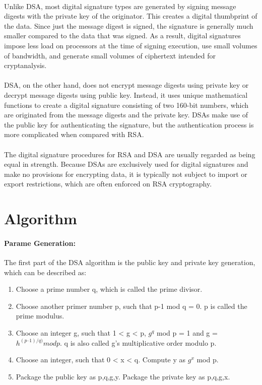 \documentclass[a4paper,12pt]{article}
\newenvironment{codeblock}{\fontfamily{pcr}\selectfont}{\par}
\begin{document}
    \paragraph{} Unlike DSA, most digital signature types are generated by signing message digests with the private key of the originator. This creates a digital thumbprint of the data. Since just the message digest is signed, the signature is generally much smaller compared to the data that was signed. As a result, digital signatures impose less load on processors at the time of signing execution, use small volumes of bandwidth, and generate small volumes of ciphertext intended for cryptanalysis.
    \paragraph{} DSA, on the other hand, does not encrypt message digests using private key or decrypt message digests using public key. Instead, it uses unique mathematical functions to create a digital signature consisting of two 160-bit numbers, which are originated from the message digests and the private key. DSAs make use of the public key for authenticating the signature, but the authentication process is more complicated when compared with RSA.
    \paragraph{} The digital signature procedures for RSA and DSA are usually regarded as being equal in strength. Because DSAs are exclusively used for digital signatures and make no provisions for encrypting data, it is typically not subject to import or export restrictions, which are often enforced on RSA cryptography.
			
\section{Algorithm}
	\paragraph{Parame Generation:} The first part of the DSA algorithm is the public key and private key generation, which can be described as: 
    \begin{codeblock}
    \begin{enumerate}
        \item Choose a prime number q, which is called the prime divisor.
        \item Choose another primer number p, such that p-1 mod q = 0. p is called the prime modulus.
        \item Choose an integer g, such that 1 < g < p, $g^{q}$ mod p = 1 and g = $h^{(p–1)/q)} mod p$. q is also called g's multiplicative order modulo p.
        \item Choose an integer, such that 0 < x < q.
    Compute y as $g^{x}$ mod p.
    	\item Package the public key as {p,q,g,y}.
    Package the private key as {p,q,g,x}.
	\end{enumerate}
    \end{codeblock}
\end{document}
